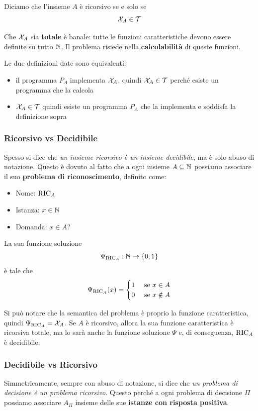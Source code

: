 Diciamo che l'insieme $A$ è ricorsivo se e solo se
$$ \mathcal{X}_A \in \mathcal{T} $$

Che $\mathcal{X}_A$ sia \textbf{totale} è banale: tutte le funzioni caratteristiche devono essere definite su tutto $\mathbb{N}$. Il problema risiede nella \textbf{calcolabilità} di queste funzioni.

Le due definizioni date sono equivalenti:
\begin{itemize}
	\item il programma $P_A$ implementa $\mathcal{X}_A$, quindi $\mathcal{X}_A \in \mathcal{T}$ perché esiste un programma che la calcola
	\item $\mathcal{X}_A \in \mathcal{T}$ quindi esiste un programma $P_A$ che la implementa e soddisfa la definizione sopra
\end{itemize}

\subsubsection{Ricorsivo vs Decidibile}

Spesso si dice che \textit{un insieme ricorsivo è un insieme decidibile}, ma è solo abuso di notazione. Questo è dovuto al fatto che a ogni insieme $A \subseteq \mathbb{N}$ possiamo associare il suo \textbf{problema di riconoscimento}, definito come:
\begin{itemize}
	\item Nome: $\text{RIC}_A$
	\item Istanza: $x \in \mathbb{N}$
	\item Domanda: $x \in A$?
\end{itemize}

La sua funzione soluzione
$$ \Psi_{\text{RIC}_A} : \mathbb{N} \rightarrow \{0,1\} $$
è tale che
$$
\Psi_{\text{RIC}_A} (x) = \begin{cases}
	1 & \text{ se } x \in A\\
	0 & \text{ se } x \notin A
\end{cases}
$$

Si può notare che la semantica del problema è proprio la funzione caratteristica, quindi $\Psi_{\text{RIC}_A} = \mathcal{X}_A$. Se $A$ è ricorsivo, allora la sua funzione caratteristica è ricorsiva totale, ma lo sarà anche la funzione soluzione $\Psi$ e, di conseguenza, $\text{RIC}_A$ è decidibile.

\subsubsection{Decidibile vs Ricorsivo}

Simmetricamente, sempre con abuso di notazione, si dice che \textit{un problema di decisione è un problema ricorsivo}. Questo perché a ogni problema di decisione $\Pi$ possiamo associare $A_\Pi$ insieme delle sue \textbf{istanze con risposta positiva}.

